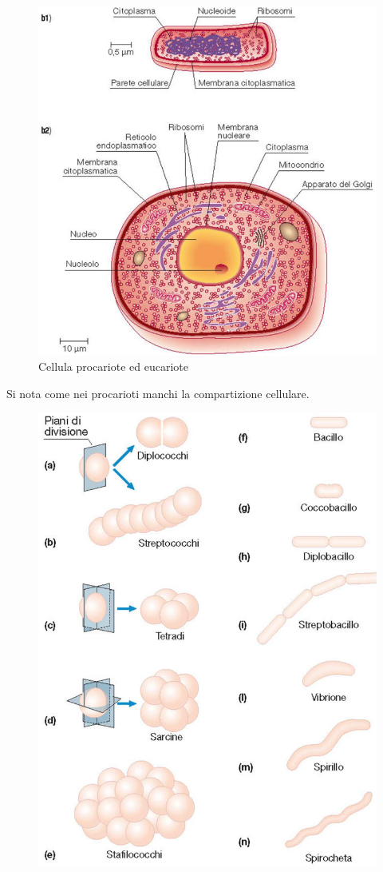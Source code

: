 \begin{multicols}{2}
\begin{figure}[H]
\includegraphics[scale = 0.3]{Pictures/CelluleEuPro.png}
\caption{Cellula procariote ed eucariote}
\end{figure}
Si nota come nei procarioti manchi la compartizione cellulare. 
\columnbreak
\begin{figure}[H]
\includegraphics[scale = 0.3]{Pictures/AggBatterici.png}

\end{figure}
\end{multicols}
